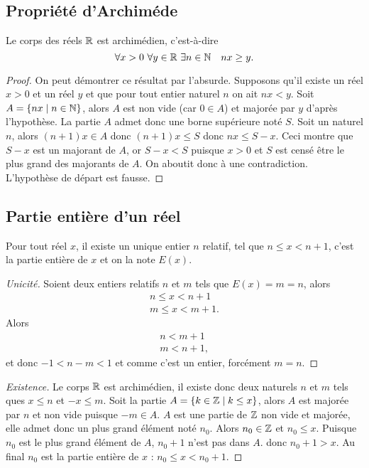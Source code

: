 \subsection{Propriété d'Archiméde}
\begin{prop}
  Le corps des réels $\mathbb{R}$ est archimédien, c'est-à-dire
  \begin{equation}
    \forall x>0 \ \forall y\in \R \ \exists n\in \N \quad nx\geq y.
  \end{equation}
\end{prop}
\begin{proof}
  On peut démontrer ce résultat par l'absurde. Supposons qu'il existe un réel $x>0$ et un réel $y$ et que pour tout entier naturel $n$ on ait $nx<y$. Soit $A=\left\{nx\mathrel{}\middle|\mathrel{}n\in \mathbb{N}\right\}$, alors $A$ est non vide (car $0\in A$) et majorée par $y$ d'après l'hypothèse. La partie $A$ admet donc une borne supérieure noté $S$. Soit un naturel $n$, alors $(n+1)x \in A$ donc $(n+1)x\leq S$ donc $nx \leq S-x$. Ceci montre que $S-x$ est un majorant de $A$, or $S-x<S$ puisque $x>0$ et $S$ est censé être le plus grand des majorants de $A$. On aboutit donc à une contradiction. L'hypothèse de départ est fausse.
\end{proof}

\subsection{Partie entière d'un réel}

\begin{prop}
  Pour tout réel $x$, il existe un unique entier $n$ relatif, tel que $n\leq x<n+1$, c'est la partie entière de $x$ et on la note $E(x)$.
\end{prop}
\begin{proof}[Unicité]
  Soient deux entiers relatifs $n$ et $m$ tels que $E(x)=m=n$, alors
  \begin{align}
    n\leq x< n+1 \\  m\leq x< m+1.
  \end{align}
  Alors
  \begin{align}
    n<m+1 \\  m<n+1,
  \end{align}
  et donc $-1<n-m<1$ et comme c'est un entier, forcément $m=n$.
\end{proof}
\begin{proof}[Existence]
  Le corps $\mathbb{R}$ est archimédien, il existe donc deux naturels $n$ et $m$ tels ques $x\leq n$ et  $-x\leq m$. Soit la partie $A=\left\{k \in \mathbb{Z}\mathrel{}\middle|\mathrel{}k\leq x\right\}$, alors $A$ est majorée par $n$ et non vide puisque $-m\in A$. $A$ est une partie de $\mathbb{Z}$ non vide et majorée, elle admet donc un plus grand élément noté $n_0$. Alors $n_0\in \mathbb{Z}$ et $n_0\leq x$. Puisque $n_0$ est le plus grand élément de $A$, $n_0+1$ n'est pas dans $A$. donc $n_0+1>x$. Au final $n_0$ est la partie entière de $x$ : $n_0\leq x<n_0+1$.
\end{proof}

